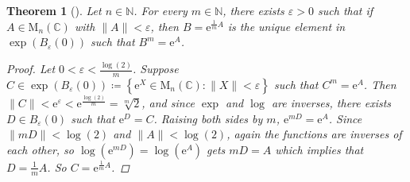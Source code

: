 \documentclass[letterpaper, 10pt]{article}
\theoremstyle{theostyle}
\newtheorem{theorem}{Theorem}[section]
\newenvironment{thmstyle}[1][]{%
    \begin{theorem}[#1]\leavevmode\vspace{-\baselineskip}\myquote%
    }{\endmyquote\end{theorem}}
\begin{document}
\begin{thmstyle}
    Let \(n \in \mathbb{N}\). For every \(m \in \mathbb{N}\), there exists \(\varepsilon > 0\) such that if \(A \in \mathrm{M}_n (\mathbb{C})\) with \(\lVert A \rVert < \varepsilon\),
    then \(B = \mathrm{e}^{\frac{1}{m}A}\) is the unique element in \(\exp (B_\varepsilon (0))\) such that \(B^m = \mathrm{e}^A\).
    
    \begin{proof}
        Let \(0 < \varepsilon < \frac{\log{(2)}}{m}\).
        Suppose \(C \in \exp{\left(B_\varepsilon (0)\right)} \coloneqq \left\{\mathrm{e}^X \in \mathrm{M}_n (\mathbb{C}) : \lVert X \rVert < \varepsilon \right\}\) such that \(C^m = \mathrm{e}^A\).
        Then \(\lVert C \rVert < \mathrm{e}^\varepsilon < \mathrm{e}^{\frac{\log{(2)}}{m}} = \sqrt[m]{2}\), and since \(\exp\) and \(\log\) are inverses, there exists \(D \in B_\varepsilon (0)\) such that \(\mathrm{e}^D = C\).
        Raising both sides by \(m\), \(\mathrm{e}^{mD} = \mathrm{e}^A\).
        Since \(\lVert mD \rVert < \log{(2)}\) and \(\lVert A \rVert < \log{(2)}\),
        again the functions are inverses of each other, so \(\log{\left(\mathrm{e}^{mD}\right)} = \log{\left(\mathrm{e}^A\right)}\) gets \(mD = A\) which implies that \(D = \frac{1}{m}A\).
        So \(C = \mathrm{e}^{\frac{1}{m}A}\).
    \end{proof}
\end{thmstyle}
\end{document}
